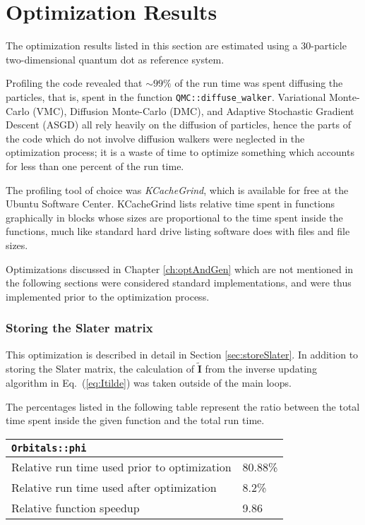 \section{Optimization Results}
\label{sec:optRes}

The optimization results listed in this section are estimated using a 30-particle two-dimensional quantum dot as reference system.

Profiling the code revealed that $\sim99\%$ of the run time was spent diffusing the particles, that is, spent in the function \verb+QMC::diffuse_walker+. Variational Monte-Carlo (VMC), Diffusion Monte-Carlo (DMC), and Adaptive Stochastic Gradient Descent (ASGD) all rely heavily on the diffusion of particles, hence the parts of the code which do not involve diffusion walkers were neglected in the optimization process; it is a waste of time to optimize something which accounts for less than one percent of the run time.  

The profiling tool of choice was \textit{KCacheGrind}, which is available for free at the Ubuntu Software Center. KCacheGrind lists relative time spent in functions graphically in blocks whose sizes are proportional to the time spent inside the functions, much like standard hard drive listing software does with files and file sizes.

Optimizations discussed in Chapter \ref{ch:optAndGen} which are not mentioned in the following sections were considered standard implementations, and were thus implemented prior to the optimization process.

\subsubsection{Storing the Slater matrix}

This optimization is described in detail in Section \ref{sec:storeSlater}. In addition to storing the Slater matrix, the calculation of $\mathbf{\tilde I}$ from the inverse updating algorithm in Eq.~(\ref{eq:Itilde}) was taken outside of the main loops.

The percentages listed in the following table represent the ratio between the total time spent inside the given function and the total run time. 

\begin{tabular}{ll}
 \verb+Orbitals::phi+ & \\
 \hline\hline
 Relative run time used prior to optimization & 80.88\% \\
 Relative run time used after optimization    & 8.2\% \\
 \hline
 Relative function speedup                   & 9.86
\end{tabular}

